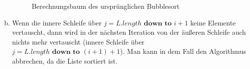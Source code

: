 \documentclass[a4paper]{scrartcl}
\begin{document}
\begin{enumerate}[(a)]
\begin{figure}[h]
            \caption{Berechnungsbaum des ursprünglichen Bubblesort}
        \end{figure}

    \item
        Wenn die innere Schleife über $j = L.length \textbf{ down to } i + 1$
        keine Elemente vertauscht, dann wird in der nächsten Iteration von der
        äußeren Schleife auch nichts mehr vertauscht (innere Schleife über
        $j = L.length \textbf{ down to } (i + 1) + 1$).
        Man kann in dem Fall den Algorithmus abbrechen, da die Liste sortiert
        ist.


\end{enumerate}
\end{document}
